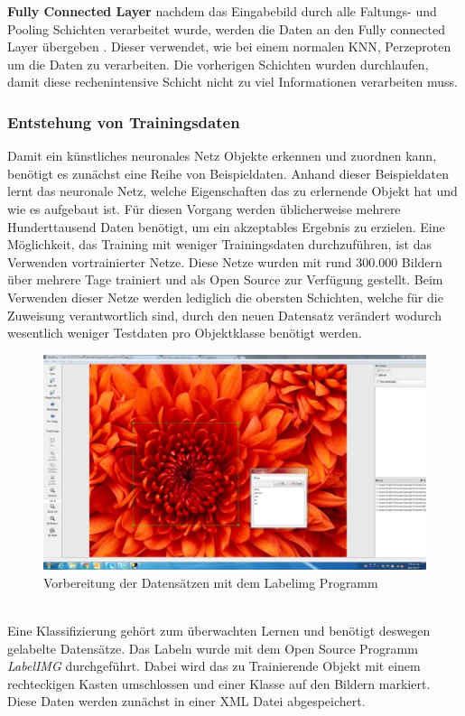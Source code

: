 \documentclass[a4paper,12pt,oneside]{article}
\begin{document}
\textbf{Fully Connected Layer}
nachdem das Eingabebild durch alle Faltungs- und Pooling Schichten verarbeitet wurde, werden die Daten an den Fully connected Layer übergeben \cite[14]{sermanet2012convolutional}. Dieser verwendet, wie bei einem normalen KNN, Perzeproten um die Daten zu verarbeiten. Die vorherigen Schichten wurden durchlaufen, damit diese rechenintensive Schicht nicht zu viel Informationen verarbeiten muss. 
  \subsubsection{Entstehung von Trainingsdaten}\label{s.trainingsdaten} 
Damit ein künstliches neuronales Netz Objekte erkennen und zuordnen kann, benötigt es zunächst eine Reihe von Beispieldaten. Anhand dieser Beispieldaten lernt das neuronale Netz, welche Eigenschaften das zu erlernende Objekt hat und wie es aufgebaut ist. Für diesen Vorgang werden üblicherweise mehrere Hunderttausend Daten benötigt, um ein akzeptables Ergebnis zu erzielen. Eine Möglichkeit, das Training mit weniger Trainingsdaten durchzuführen, ist das Verwenden vortrainierter Netze. Diese Netze wurden mit rund 300.000 Bildern über mehrere Tage trainiert und als Open Source zur Verfügung gestellt. Beim Verwenden dieser Netze werden lediglich die obersten Schichten, welche für die Zuweisung verantwortlich sind, durch den neuen Datensatz verändert wodurch wesentlich weniger Testdaten pro Objektklasse benötigt werden. 
\begin{figure}
	[h]
	\centering
	\includegraphics[scale=1.0]{Sources/labelimg.jpg}
	\caption{Vorbereitung der Datensätzen mit dem Labelimg Programm \cite{labelimg2019}}
	\label{img:labelimg}
\end{figure}\\
Eine Klassifizierung gehört zum überwachten Lernen und benötigt deswegen gelabelte Datensätze. Das Labeln wurde mit dem Open Source Programm \textit{LabelIMG} \cite{labelimg2019} durchgeführt. Dabei wird das zu Trainierende Objekt mit einem rechteckigen Kasten umschlossen und einer Klasse auf den Bildern markiert. Diese Daten werden zunächst in einer XML Datei abgespeichert. 
\end{document}
